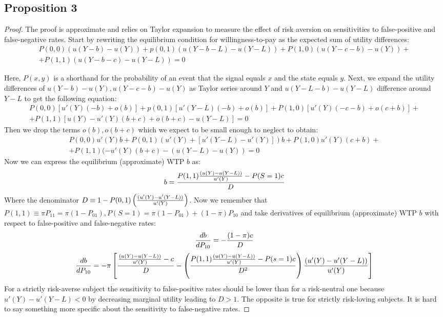 \documentclass[12pt,a4paper]{article}
\begin{document}
\subsection{Proposition 3}

\begin{proof}

The proof is approximate and relies on Taylor expansion to measure the effect of risk aversion on sensitivities to false-positive and false-negative rates. Start by rewriting the equilibrium condition for willingness-to-pay as the expected sum of utility differences:
\begin{equation}
\begin{split}
P(0,0) (u(Y-b)-u(Y))+p(0,1)(u(Y-b-L)-u(Y-L))+P(1,0)(u(Y-c-b)-u(Y))+\\+P(1,1)(u(Y-b-c)-u(Y-L))=0
\end{split}
\end{equation}

Here, $P(x,y)$ is a shorthand for the probability of an event that the signal equals $x$ and the state equals $y$. Next, we expand the utility differences of $u(Y-b)-u(Y), u(Y-c-b)-u(Y)$ as Taylor series around $Y$ and $u(Y-L-b)-u(Y-L)$ difference around $Y-L$ to get the following equation:\begin{equation}
\begin{split}
P(0,0) [u'(Y)(-b)+o(b)]+p(0,1)[u'(Y-L)(-b)+o(b)]+P(1,0)[u'(Y)(-c-b)+o(c+b)]+\\+P(1,1)[u(Y)-u'(Y)(b+c)+o(b+c)-u(Y-L)]=0
\end{split}
\end{equation}
Then we drop the terms $o(b), o(b+c)$ which we expect to be small enough to neglect to obtain:
\begin{equation}
\begin{split}
P(0,0)u'(Y)b+P(0,1)(u'(Y)+[u'(Y-L)-u'(Y)])b+P(1,0)u'(Y)(c+b)+\\+P(1,1)(-u'(Y)(b+c)-(u(Y-L)-u(Y))=0
\end{split}
\end{equation}
Now we can express the equilibrium (approximate) WTP $b$ as:
\[b={ P(1,1){(u(Y)-u(Y-L)) \over u'(Y)}-P(S=1)c \over D} \]
Where the denominator $D\equiv 1-P(0,1)\left({(u'(Y)-u'(Y-L))\over u'(Y)}\right)$. Now we remember that $P(1,1) \equiv \pi P_{11}=\pi (1-P_{01}), P(S=1)=\pi (1-P_{01})+(1-\pi)P_{10}$ and take derivatives of equilibrium (approximate) WTP $b$ with respect to false-positive and false-negative rates:
\[{db \over dP_{10}}=-{(1-\pi)c \over D} \]
\[{db \over dP_{10}}=-\pi \left[ {{(u(Y)-u(Y-L)) \over u'(Y)}-c \over D}-\left({P(1,1){(u(Y)-u(Y-L)) \over u'(Y)}-P(s=1)c \over D^2}\right) {(u'(Y)-u'(Y-L))\over u'(Y)} \right] \]
For a strictly risk-averse subject the sensitivity to false-positive rates should be lower than for a risk-neutral one because $u'(Y)-u'(Y-L)<0$ by decreasing marginal utility leading to $D>1$. The opposite is true for strictly risk-loving subjects. It is hard to say something more specific about the sensitivity to false-negative rates. 


\end{proof}
\end{document}
